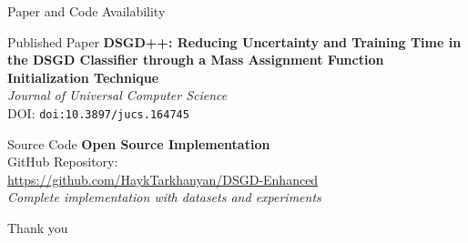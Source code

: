 \documentclass[aspectratio=169]{beamer}
\newcommand{\doi}[1]{\texttt{doi:#1}}
\begin{document}
\begin{frame}{Paper and Code Availability}
\begin{center}
\begin{block}{Published Paper}
\textbf{DSGD++: Reducing Uncertainty and Training Time in the DSGD Classifier through a Mass Assignment Function Initialization Technique}
\\[0.5em]
\textit{Journal of Universal Computer Science}
\\[0.3em]
DOI: \doi{10.3897/jucs.164745}
\end{block}

\begin{block}{Source Code}
\textbf{Open Source Implementation}
\\[0.5em]
GitHub Repository: \\
\url{https://github.com/HaykTarkhanyan/DSGD-Enhanced}
\\[0.3em]
\textit{Complete implementation with datasets and experiments}
\end{block}
\end{center}
\end{frame}

\begin{frame}
    \begin{center}
        \Huge Thank you
    \end{center}
\end{frame}
\end{document}
